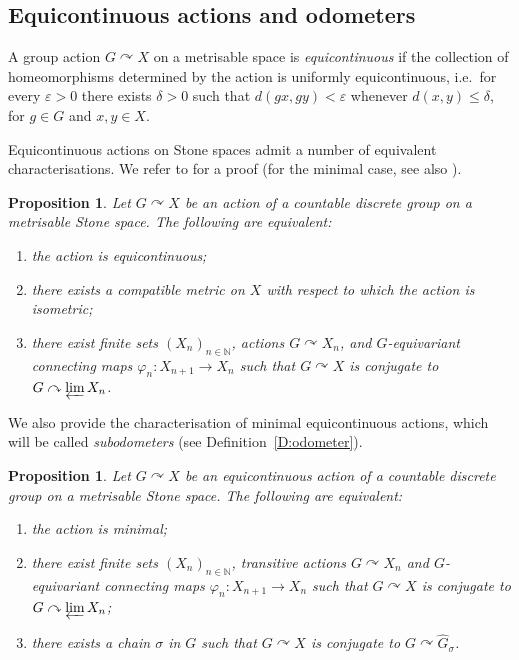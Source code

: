 \documentclass[11pt,a4,leqno]{amsart}
\newtheorem{prop}[thm]{Proposition}
\theoremstyle{definition}
\theoremstyle{remark}
\numberwithin{equation}{section}
\theoremstyle{plain}
\newcommand{\Nb}{\mathbb{N}}
\begin{document}
\subsection{Equicontinuous actions and odometers}

A group action $G\curvearrowright X$ on a metrisable space is \emph{equicontinuous} if the collection of homeomorphisms determined by the action is uniformly equicontinuous, i.e.\ for every $\varepsilon > 0$ there exists $\delta > 0$ such that $d(gx,gy) < \varepsilon$ whenever $d(x,y)\le \delta$, for $g\in G$ and $x,y\in X$.

Equicontinuous actions on Stone spaces admit a number of equivalent characterisations. We refer to \cite[Theorem 2.3]{Pil23} for a proof (for the minimal case, see also \cite{CorPet08,CorMed16,HawSkaWhiZac13,Pil23,CorHau26}).     

\begin{prop}\label{P:equi}
    Let $G\curvearrowright X$ be an action of a countable discrete group on a metrisable Stone space. The following are equivalent:
    \begin{enumerate}
        \item the action is equicontinuous;
        \item there exists a compatible metric on $X$ with respect to which the action is isometric;
        \item there exist finite sets $(X_n)_{n\in \Nb}$, actions $G\curvearrowright X_n$, and $G$-equivariant connecting maps $\varphi_n : X_{n+1} \to X_n$ such that $G\curvearrowright X$ is conjugate to $G\curvearrowright \varprojlim X_n$.
    \end{enumerate}
\end{prop}

We also provide the characterisation of minimal equicontinuous actions, which will be called \emph{subodometers} (see Definition~\ref{D:odometer}). 

\begin{prop}\label{P:min}
    Let $G\curvearrowright X$ be an equicontinuous action of a countable discrete group on a metrisable Stone space. The following are equivalent:
    \begin{enumerate}
        \item the action is minimal;
        \item there exist finite sets $(X_n)_{n\in \Nb}$, transitive actions $G\curvearrowright X_n$ and $G$-equivariant connecting maps $\varphi_n : X_{n+1} \to X_n$ such that $G\curvearrowright X$ is conjugate to $G\curvearrowright \varprojlim X_n$;
        \item there exists a chain $\sigma$ in $G$ such that $G\curvearrowright X$ is conjugate to $G \curvearrowright \widehat{G}_\sigma$.
    \end{enumerate}
\end{prop}
\end{document}
